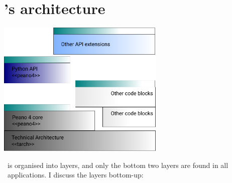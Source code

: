\chapter{\Peano's architecture}
\label{chapter:architecture}


\begin{center}
  \includegraphics[width=0.6\textwidth]{../src/peano4/architecture-layers.pdf}
\end{center}


\noindent
\Peano\ is organised into layers, and only the bottom two layers are found in
all \Peano\ applications.
I discuss the layers bottom-up:

